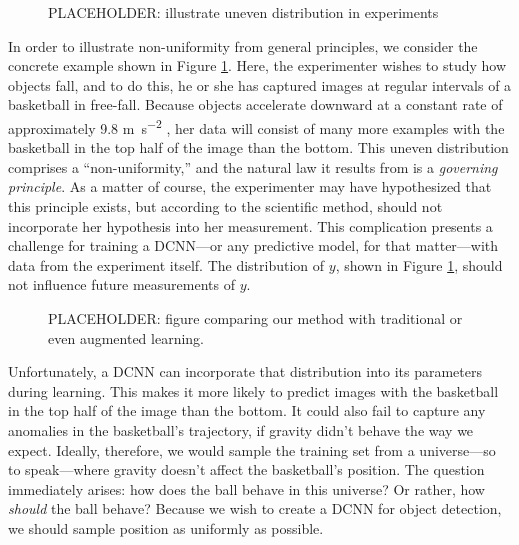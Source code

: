 \documentclass[10pt, draftcls]{IEEEtran}
\begin{document}
\begin{figure}
  \centering
  \caption{PLACEHOLDER: illustrate uneven distribution in experiments}
  \label{fig:free-fall}
\end{figure}

In order to illustrate non-uniformity from general principles, we consider the
concrete example shown in Figure \ref{fig:free-fall}. Here, the experimenter
wishes to study how objects fall, and to do this, he or she has captured images
at regular intervals of a basketball in free-fall. Because objects accelerate
downward at a constant rate of approximately 9.8 \si{\meter\per\second^2}
\cite{munroe_wikipedian_nodate}, her data will consist of many more examples
with the basketball in the top half of the image than the bottom. This uneven
distribution comprises a ``non-uniformity,'' and the natural law it results from
is a \emph{governing principle}. As a matter of course, the experimenter may
have hypothesized that this principle exists, but according to the scientific
method, should not incorporate her hypothesis into her measurement. This
complication presents a challenge for training a DCNN---or any predictive model,
for that matter---with data from the experiment itself. The distribution of $y$,
shown in Figure \ref{fig:free-fall}, should not influence future measurements of
$y$.


\begin{figure*}
  \centering
  \subfloat[]{
    \label{fig:traditional-graph}
  }
  \hfill
  \subfloat[]{
    \label{fig:artifice-graph}
  }
  \caption{PLACEHOLDER: figure comparing our method with traditional or even
    augmented learning.}
  \label{fig:overview}
\end{figure*}

Unfortunately, a DCNN can incorporate that distribution into its parameters
during learning. This makes it more likely to predict images with the basketball
in the top half of the image than the bottom. It could also fail to capture any
anomalies in the basketball's trajectory, if gravity didn't behave the way we
expect. Ideally, therefore, we would sample the training set from a
universe---so to speak---where gravity doesn't affect the basketball's
position. The question immediately arises: how does the ball behave in this
universe? Or rather, how \emph{should} the ball behave? Because we wish to
create a DCNN for object detection, we should sample position as uniformly as
possible.
\end{document}
